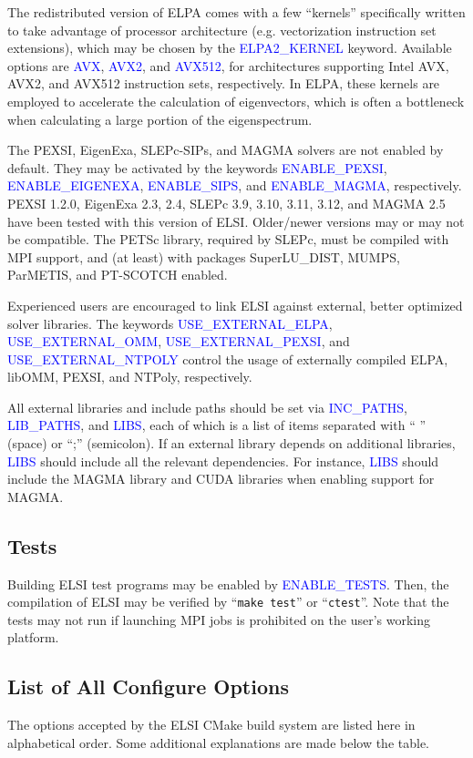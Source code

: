 \documentclass{report}
\newcommand{\tcb}[1]{\textcolor{blue}{#1}}
\begin{document}
The redistributed version of ELPA comes with a few ``kernels'' specifically written to take advantage of processor architecture (e.g. vectorization instruction set extensions), which may be chosen by the \tcb{ELPA2\_KERNEL} keyword. Available options are \tcb{AVX}, \tcb{AVX2}, and \tcb{AVX512}, for architectures supporting Intel AVX, AVX2, and AVX512 instruction sets, respectively. In ELPA, these kernels are employed to accelerate the calculation of eigenvectors, which is often a bottleneck when calculating a large portion of the eigenspectrum.

The PEXSI, EigenExa, SLEPc-SIPs, and MAGMA solvers are not enabled by default. They may be activated by the keywords \tcb{ENABLE\_PEXSI}, \tcb{ENABLE\_EIGENEXA}, \tcb{ENABLE\_SIPS}, and \tcb{ENABLE\_MAGMA}, respectively. PEXSI 1.2.0, EigenExa 2.3, 2.4, SLEPc 3.9, 3.10, 3.11, 3.12, and MAGMA 2.5 have been tested with this version of ELSI. Older/newer versions may or may not be compatible. The PETSc library, required by SLEPc, must be compiled with MPI support, and (at least) with packages SuperLU\_DIST, MUMPS, ParMETIS, and PT-SCOTCH enabled.

Experienced users are encouraged to link ELSI against external, better optimized solver libraries. The keywords \tcb{USE\_EXTERNAL\_ELPA}, \tcb{USE\_EXTERNAL\_OMM}, \tcb{USE\_EXTERNAL\_PEXSI}, and \tcb{USE\_EXTERNAL\_NTPOLY} control the usage of externally compiled ELPA, libOMM, PEXSI, and NTPoly, respectively.

All external libraries and include paths should be set via \tcb{INC\_PATHS}, \tcb{LIB\_PATHS}, and \tcb{LIBS}, each of which is a list of items separated with `` '' (space) or ``;'' (semicolon). If an external library depends on additional libraries, \tcb{LIBS} should include all the relevant dependencies. For instance, \tcb{LIBS} should include the MAGMA library and CUDA libraries when enabling support for MAGMA.

\subsection{Tests}
\label{subsec:config_tests}
Building ELSI test programs may be enabled by \tcb{ENABLE\_TESTS}. Then, the compilation of ELSI may be verified by ``\verb+make test+'' or ``\verb+ctest+''. Note that the tests may not run if launching MPI jobs is prohibited on the user's working platform.

\subsection{List of All Configure Options}
\label{subsec:config_options}
The options accepted by the ELSI CMake build system are listed here in alphabetical order. Some additional explanations are made below the table.
\end{document}
